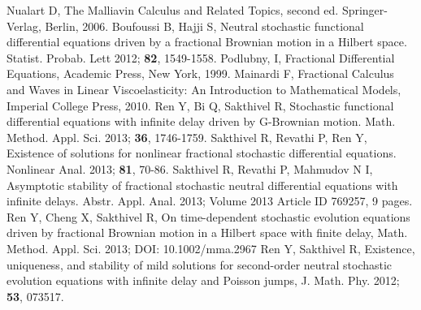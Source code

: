 \documentclass[12pt,a4paper,oneside,reqno,notitlepage]{amsart}
\theoremstyle{plain}
\numberwithin{equation}{section}
\begin{document}
\begin{thebibliography}{99}
 Nualart D, The Malliavin Calculus and Related Topics, second ed. Springer-Verlag, Berlin, 2006.
 Boufoussi B, Hajji S, Neutral stochastic functional differential equations driven by a fractional Brownian motion in a Hilbert
space. Statist. Probab. Lett 2012; \textbf{82}, 1549-1558.
 Podlubny, I, Fractional Differential Equations, Academic Press, New York, 1999.
 Mainardi F, Fractional Calculus and Waves in Linear Viscoelasticity: An Introduction to Mathematical Models, Imperial College Press, 2010.
 Ren Y, Bi Q, Sakthivel R, Stochastic functional differential equations with infinite delay driven by G-Brownian motion. Math. Method. Appl. Sci. 2013; \textbf{36}, 1746-1759.
 Sakthivel R, Revathi P, Ren Y, Existence of solutions for nonlinear fractional stochastic differential equations. Nonlinear Anal. 2013; \textbf{81}, 70-86.
 Sakthivel R, Revathi P, Mahmudov N I, Asymptotic stability of fractional stochastic neutral differential equations with infinite delays. Abstr. Appl. Anal. 2013; Volume 2013  Article ID 769257, 9 pages.
  Ren Y, Cheng X, Sakthivel R, On time-dependent stochastic evolution equations driven by fractional Brownian motion in a Hilbert space with finite delay, Math. Method. Appl. Sci. 2013; DOI: 10.1002/mma.2967
 Ren Y, Sakthivel R, Existence, uniqueness, and stability of mild solutions for second-order neutral stochastic evolution equations with infinite delay and Poisson jumps, J. Math. Phy. 2012; \textbf{53}, 073517.




\end{thebibliography}
\end{document}
